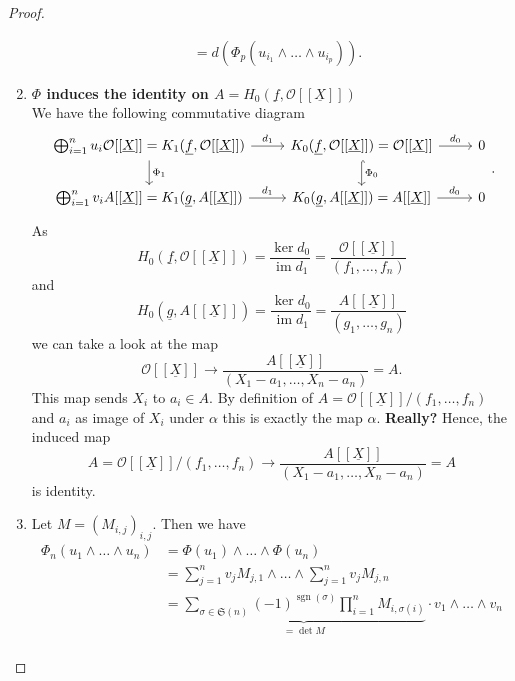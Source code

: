 \documentclass{article}
\theoremstyle{plain}%
\theoremstyle{definition}
\theoremstyle{remark}
\newcommand{\im}{\operatorname{im}}
\begin{document}
\begin{proof}
\begin{enumerate}
\begin{align*}
            &= d(\Phi_p(u_{i_1}\wedge\dots\wedge u_{i_p})).
        \end{align*}
        \item \textbf{\(\Phi\) induces the identity on \(A = H_0(\underline{f}, \mathcal{O}[[\underline{X}]])\)}\\
        We have the following commutative diagram
        \[
            \begin{tikzcd}
                \bigoplus_{i=1}^n u_i \mathcal{O}[[\underline{X}]] = K_1(\underline{f}, \mathcal{O}[[\underline{X}]]) 
                \arrow[r, "d_1"] \arrow[d, "\Phi_1"] & K_0(\underline{f}, \mathcal{O}[[\underline{X}]]) \arrow[r, "d_0"] 
                \arrow[d, hook, "\Phi_0"] = \mathcal{O}[[\underline{X}]] & 0\\
                \bigoplus_{i=1}^n v_i A[[\underline{X}]] = K_1(\underline{g}, A[[\underline{X}]]) 
                \arrow[r, "d_1"] & K_0(\underline{g}, A[[\underline{X}]]) = A[[\underline{X}]] \arrow[r, "d_0"] & 0
            \end{tikzcd}.
        \]
        As 
        \[
            H_0(\underline{f}, \mathcal{O}[[\underline{X}]]) = \frac{\ker d_0}{\im d_1} 
            = \frac{\mathcal{O}[[\underline{X}]]}{(f_1, \dots, f_n)}
        \] and
        \[
            H_0(\underline{g}, A[[\underline{X}]]) = \frac{\ker d_0}{\im d_1} 
            = \frac{A[[\underline{X}]]}{(g_1, \dots, g_n)}
        \]
        we can take a look at the map
        \[
            \mathcal{O}[[\underline{X}]] \to \frac{A[[\underline{X}]]}{(X_1 - a_1, \dots, X_n - a_n)} = A.
        \]
        This map sends \(X_i\) to \(a_i \in A\).
        By definition of \(A = \mathcal{O}[[\underline{X}]]/(f_1, \dots, f_n)\) and \(a_i\) as image of \(X_i\)
        under \(\alpha\) this is exactly the map \(\alpha\). \textbf{Really?} Hence, the induced map
        \[
            A = \mathcal{O}[[\underline{X}]]/(f_1, \dots, f_n) \to 
            \frac{A[[\underline{X}]]}{(X_1 - a_1, \dots, X_n - a_n)} = A
        \]
        is identity.
        \item Let \(M = (M_{i,j})_{i,j}\). Then we have
        \begin{align*}
            \Phi_n(u_1 \wedge \dots \wedge u_n) &= \Phi(u_1) \wedge \dots \wedge \Phi(u_n)\\
            &= \sum_{j=1}^n v_jM_{j,1} \wedge \dots \wedge \sum_{j=1}^n v_jM_{j,n}\\
            &= \underbrace{\sum_{\sigma \in \mathfrak{S}(n)} (-1)^{\operatorname{sgn}(\sigma)} 
            \prod_{i=1}^n M_{i,\sigma(i)}}_{= \det M} \cdot v_1 \wedge \dots \wedge v_n\\

\end{align*}
\end{enumerate}
\end{proof}
\end{document}
